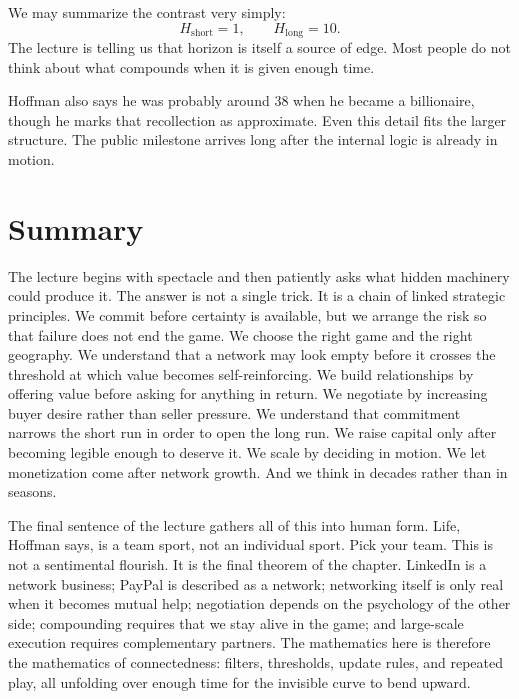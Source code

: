 We may summarize the contrast very simply:
\begin{equation}
H_{\mathrm{short}}=1, \qquad H_{\mathrm{long}}=10.
\end{equation}
The lecture is telling us that horizon is itself a source of edge. Most people do not think about what compounds when it is given enough time.

Hoffman also says he was probably around \(38\) when he became a billionaire, though he marks that recollection as approximate. Even this detail fits the larger structure. The public milestone arrives long after the internal logic is already in motion.

\section{Summary}

The lecture begins with spectacle and then patiently asks what hidden machinery could produce it. The answer is not a single trick. It is a chain of linked strategic principles. We commit before certainty is available, but we arrange the risk so that failure does not end the game. We choose the right game and the right geography. We understand that a network may look empty before it crosses the threshold at which value becomes self-reinforcing. We build relationships by offering value before asking for anything in return. We negotiate by increasing buyer desire rather than seller pressure. We understand that commitment narrows the short run in order to open the long run. We raise capital only after becoming legible enough to deserve it. We scale by deciding in motion. We let monetization come after network growth. And we think in decades rather than in seasons.

The final sentence of the lecture gathers all of this into human form. Life, Hoffman says, is a team sport, not an individual sport. Pick your team. This is not a sentimental flourish. It is the final theorem of the chapter. LinkedIn is a network business; PayPal is described as a network; networking itself is only real when it becomes mutual help; negotiation depends on the psychology of the other side; compounding requires that we stay alive in the game; and large-scale execution requires complementary partners. The mathematics here is therefore the mathematics of connectedness: filters, thresholds, update rules, and repeated play, all unfolding over enough time for the invisible curve to bend upward.